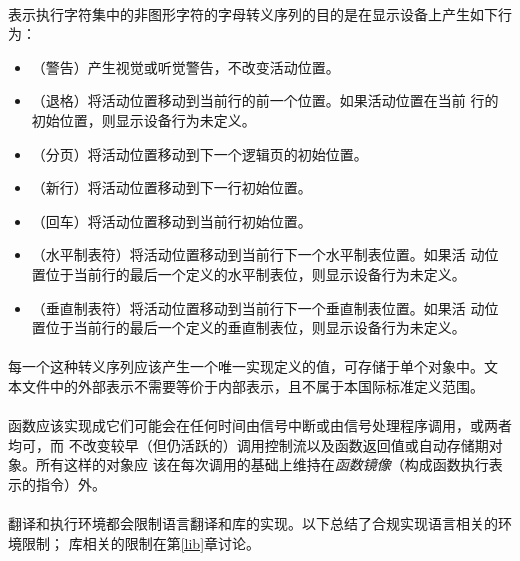 \paragraph{}
表示执行字符集中的非图形字符的字母转义序列的目的是在显示设备上产生如下行为：
\begin{itemize}
  \item{（警告）产生视觉或听觉警告，不改变活动位置。}
  \item{（退格）将活动位置移动到当前行的前一个位置。如果活动位置在当前
    行的初始位置，则显示设备行为未定义。}
  \item{（分页）将活动位置移动到下一个逻辑页的初始位置。}
  \item{（新行）将活动位置移动到下一行初始位置。}
  \item{（回车）将活动位置移动到当前行初始位置。}
  \item{（水平制表符）将活动位置移动到当前行下一个水平制表位置。如果活
    动位置位于当前行的最后一个定义的水平制表位，则显示设备行为未定义。}
  \item{（垂直制表符）将活动位置移动到当前行下一个垂直制表位置。如果活
    动位置位于当前行的最后一个定义的垂直制表位，则显示设备行为未定义。}
\end{itemize}

\paragraph{}
每一个这种转义序列应该产生一个唯一实现定义的值，可存储于单个对象中。文
本文件中的外部表示不需要等价于内部表示，且不属于本国际标准定义范围。


\paragraph{}
函数应该实现成它们可能会在任何时间由信号中断或由信号处理程序调用，或两者均可，而
不改变较早（但仍活跃的）调用控制流以及函数返回值或自动存储期对象。所有这样的对象应
该在每次调用的基础上维持在\textit{函数镜像}（构成函数执行表示的指令）外。

\paragraph{}
翻译和执行环境都会限制语言翻译和库的实现。以下总结了合规实现语言相关的环境限制；
库相关的限制在第\ref{lib}章讨论。

